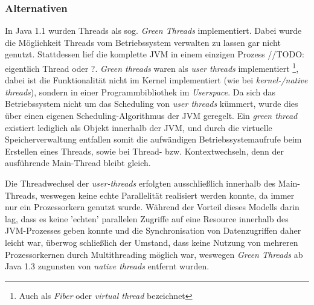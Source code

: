 \subsubsection{Alternativen}
In Java 1.1 wurden Threads als sog. \textit{Green Threads} implementiert. Dabei wurde die Möglichkeit Threads vom Betriebssystem verwalten zu lassen
gar nicht genutzt. Stattdessen lief die komplette JVM in einem einzigen Prozess //TODO: eigentlich Thread oder ?.
\textit{Green threads} waren als \textit{user threads} implementiert \footnote{Auch als \textit{Fiber} oder \textit{virtual thread} bezeichnet},
dabei ist die Funktionalität
nicht im Kernel implementiert (wie bei \textit{kernel-/native threads}), sondern in einer Programmbibliothek im \textit{Userspace}.
Da sich das Betriebssystem nicht um das Scheduling von \textit{user threads} kümmert, wurde dies über einen eigenen Scheduling-Algorithmus der JVM
geregelt.\parencite{Oracle2010}
Ein \textit{green thread} existiert lediglich als Objekt innerhalb der JVM, und durch die virtuelle Speicherverwaltung entfallen somit
die aufwändigen Betriebssystemaufrufe beim
Erstellen eines Threads, sowie bei Thread- bzw. Kontextwechseln, denn der ausführende Main-Thread bleibt gleich.

Die Threadwechsel der \textit{user-threads} erfolgten ausschließlich innerhalb des Main-Threads, weswegen keine echte Parallelität realisiert werden konnte,
da immer nur ein Prozessorkern genutzt wurde.
Während der Vorteil dieses Modells darin lag, dass es keine 'echten' parallelen Zugriffe auf eine Resource innerhalb des JVM-Prozesses geben konnte
und die Synchronisation von Datenzugriffen daher leicht war, überwog schließlich der Umstand, dass keine Nutzung von mehreren Prozessorkernen
durch Multithreading möglich war, weswegen \textit{Green Threads} ab Java 1.3 zugunsten von \textit{native threads} entfernt wurden.

